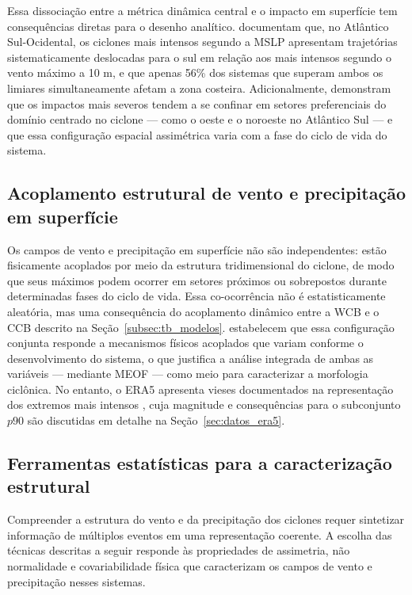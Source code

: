 Essa dissociação entre a métrica dinâmica central e o impacto em superfície tem consequências diretas para o desenho analítico.
\citet{andrade2024composite} documentam que, no Atlântico Sul-Ocidental, os ciclones mais intensos segundo a MSLP apresentam trajetórias sistematicamente deslocadas para o sul em relação aos mais intensos segundo o vento máximo a 10 m, e que apenas 56\% dos sistemas que superam ambos os limiares simultaneamente afetam a zona costeira.
Adicionalmente, \citet{gramcianinov2023impact} demonstram que os impactos mais severos tendem a se confinar em setores preferenciais do domínio centrado no ciclone — como o oeste e o noroeste no Atlântico Sul — e que essa configuração espacial assimétrica varia com a fase do ciclo de vida do sistema.

\subsection{Acoplamento estrutural de vento e precipitação em superfície}\label{subsec:tb_compound_def}
Os campos de vento e precipitação em superfície não são independentes: estão fisicamente acoplados por meio da estrutura tridimensional do ciclone, de modo que seus máximos podem ocorrer em setores próximos ou sobrepostos durante determinadas fases do ciclo de vida.
Essa co-ocorrência não é estatisticamente aleatória, mas uma consequência do acoplamento dinâmico entre a WCB e o CCB descrito na Seção~\ref{subsec:tb_modelos}.
\citet{chen2025characteristics} estabelecem que essa configuração conjunta responde a mecanismos físicos acoplados que variam conforme o desenvolvimento do sistema, o que justifica a análise integrada de ambas as variáveis — mediante MEOF — como meio para caracterizar a morfologia ciclônica.
No entanto, o ERA5 apresenta vieses documentados na representação dos extremos mais intensos \citep{chen2024evaluation}, cuja magnitude e consequências para o subconjunto $p90$ são discutidas em detalhe na Seção~\ref{sec:datos_era5}.

\subsection{Ferramentas estatísticas para a caracterização estrutural}\label{subsec:tb_herramientas}

Compreender a estrutura do vento e da precipitação dos ciclones requer sintetizar informação de múltiplos eventos em uma representação coerente.
A escolha das técnicas descritas a seguir responde às propriedades de assimetria, não normalidade e covariabilidade física que caracterizam os campos de vento e precipitação nesses sistemas.

